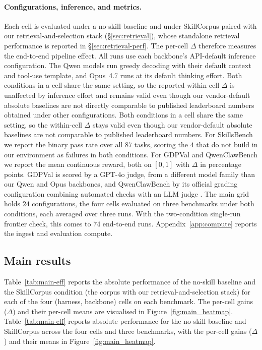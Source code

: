 \paragraph{Configurations, inference, and metrics.}
Each cell is evaluated under a no-skill baseline and under
SkillCorpus paired with our retrieval-and-selection stack
(\S\ref{sec:retrieval}), whose standalone retrieval performance
is reported in \S\ref{sec:retrieval-perf}.  The per-cell
$\Delta$ therefore measures the end-to-end pipeline effect.  All
runs use each backbone's API-default
inference configuration.  The Qwen models run greedy decoding
with their default context and tool-use template, and Opus~4.7
runs at its default thinking effort.  \ifarxiv
Both conditions in a cell
share the same setting, so the reported within-cell $\Delta$ is
unaffected by inference effort and remains valid even though our
vendor-default absolute baselines are not directly comparable to
published leaderboard numbers obtained under other
configurations.
\else
Both conditions in a cell share the same setting, so the within-cell
$\Delta$ stays valid even though our vendor-default absolute
baselines are not comparable to published leaderboard numbers.
\fi  For SkillsBench we report the binary
pass rate over all $87$ tasks, scoring the $4$ that
do not build in our environment as failures in both
conditions.  For GDPVal and QwenClawBench we report the mean
continuous reward, both on $[0,1]$ with $\Delta$ in percentage
points.  GDPVal is scored by a GPT-4o judge, from a different
model family than our Qwen and Opus backbones, and QwenClawBench
by its official grading configuration combining automated checks
with an LLM judge \citep{QwenClawBench2026}.  The main grid holds $24$ configurations, the four cells
evaluated on three benchmarks under both conditions, each
averaged over three runs.  With the two-condition single-run
frontier check, this comes to $74$ end-to-end runs.
Appendix~\ref{app:compute} reports the ingest and evaluation
compute.

\subsection{Main results}
\label{sec:main-results}

\ifarxiv
Table~\ref{tab:main-eff} reports the absolute performance of
the no-skill baseline and the SkillCorpus condition (the corpus
with our retrieval-and-selection stack) for each of the four
(harness, backbone) cells on each benchmark.  The per-cell
gains ($\Delta$) and their per-cell means are visualised in
Figure~\ref{fig:main_heatmap}.
\else
Table~\ref{tab:main-eff} reports absolute performance for the
no-skill baseline and SkillCorpus across the four cells and three
benchmarks, with the per-cell gains ($\Delta$) and their means in
Figure~\ref{fig:main_heatmap}.
\fi

